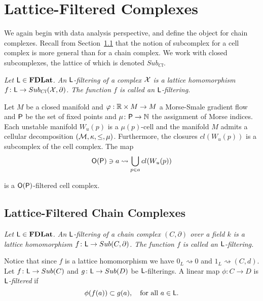 \section{Lattice-Filtered  Complexes}\label{sec:lfc}


We again begin with data analysis perspective, and define the object for chain complexes.  Recall from Section~\ref{} that the notion of subcomplex for a cell complex is more general than for a chain complex.  We work with closed subcomplexes, the lattice of which is denoted $Sub_{Cl}$.

\begin{defn}
{\em
Let ${\mathsf L}\in {\bf FDLat}$.
An \emph{${\mathsf L}$-filtering of a complex ${\mathcal X}$} is a lattice homomorphism $f\colon {\mathsf L} \to Sub_{Cl}({\mathcal X},\partial)$.
The function $f$ is called an \emph{${\mathsf L}$-filtering}.
}
\end{defn}

\begin{ex}
Let $M$ be a closed manifold and $\varphi:{\mathbb{R}}\times M\to M$ a Morse-Smale gradient flow and ${\mathsf P}$ be the set of fixed points and $\mu\colon {\mathsf P}\to {\mathbb{N}}$ the assignment of Morse indices.  Each unstable manifold $W_u(p)$ is a $\mu(p)$-cell and the manifold $M$ admits a cellular decomposition $({\mathcal M},\kappa,\leq,\mu)$.  Furthermore, the closures $cl(W_u(p))$ is a subcomplex of the cell complex.  The map 
\[
{\mathsf O}({\mathsf P}) \ni a \rightsquigarrow \bigcup_{p\in a} cl(W_u(p))
\]

is a ${\mathsf O}({\mathsf P})$-filtered cell complex.
\end{ex}

\subsection{Lattice-Filtered Chain Complexes}


\begin{defn}
{\em
Let ${\mathsf L}\in {\bf FDLat}$.
An \emph{${\mathsf L}$-filtering of a chain complex $(C,\partial)$ over a field $k$} is a lattice homomorphism $f\colon {\mathsf L} \to Sub(C,\partial)$.
The function $f$ is called an \emph{${\mathsf L}$-filtering}.
}
\end{defn}


Notice that since $f$ is a lattice homomorphism we have $0_L\rightsquigarrow 0$ and $1_L \rightsquigarrow (C,d)$.  Let $f\colon {\mathsf L} \to Sub(C)$ and $g\colon {\mathsf L} \to Sub(D)$ be ${\mathsf L}$-filterings. 
A linear map $\phi\colon C\to D$ is {\em ${\mathsf L}$-filtered} if
\[
\phi(f(a)) \subset g(a),\quad\text{for all $a\in{\mathsf L}$}.
\]




